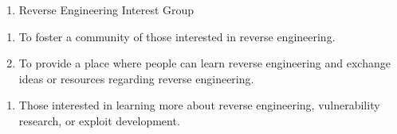 

\begin{enumerate}
	\item Reverse Engineering Interest Group
\end{enumerate}


\begin{enumerate}
	\item To foster a community of those interested in reverse engineering.
	\item To provide a place where people can learn reverse engineering and exchange
	      ideas or resources regarding reverse engineering.
\end{enumerate}


\begin{enumerate}
	\item Those interested in learning more about reverse engineering, vulnerability
	      research, or exploit development.
\end{enumerate}